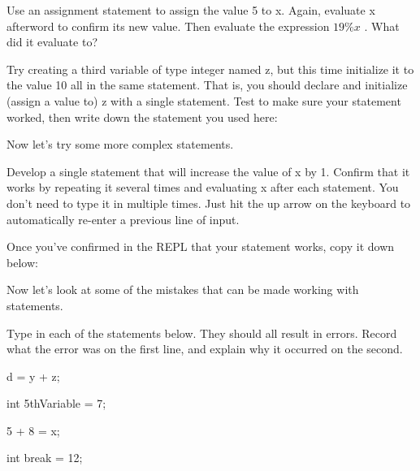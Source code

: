 \begin{exer} Use an assignment statement to assign the value 5 to x. Again, 
evaluate x afterword to confirm its new value. Then evaluate the expression $19\%x$ . 
What did it evaluate to?  

\evalline

Try creating a third variable of type integer named z, but this time initialize it to the value 10 all in the same statement. That is, you should declare and initialize (assign a value to) z with a single statement. Test to make sure your statement worked, then write down the statement you used here:

\evalline

\end{exer}

Now let's try some more complex statements. 

\begin{exer}
Develop a single statement that will increase the value of x by 1. Confirm 
that it works by repeating it several times and evaluating x after each 
statement. You don't need to type it in multiple times. Just hit the up arrow on the keyboard to automatically re-enter a previous line of input. 

Once you've confirmed in the REPL that your statement works, copy it down below:

\evalline

\end{exer}

Now let's look at some of the mistakes that can be made working with statements. 

\begin{eval}
Type in each of the statements below. They should all result in errors. Record 
what the error was on the first line, and explain why it occurred on the second. 
\begin{sevalenum}
\item d = y + z;

\evallinetwo

\item int 5thVariable = 7;

\evallinetwo

\item 5 + 8 = x;

\evallinetwo

\item int break = 12;

\evallinetwo

\end{sevalenum}
\end{eval}


